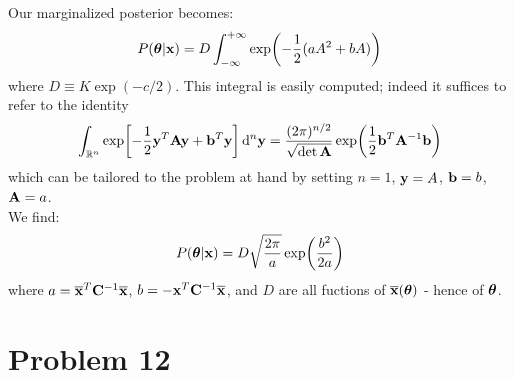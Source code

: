 \documentclass[a4paper]{article}
\newcommand{\R}{\mathbb{R}}
\newcommand{\mat}[1]{\vb{#1}}
\begin{document}
Our marginalized posterior becomes:
\begin{equation*}
    P(\vb*{\theta}|\vb{x}) = D \int_{-\infty}^{+\infty} \exp(-\frac{1}{2}(aA^2+bA))
\end{equation*}
where $D\equiv K \exp(-c/2)$. This integral is easily computed; indeed it suffices to refer to the identity
\begin{equation*}
    \int_{\R^n} \exp[-\frac{1}{2}\vb{y}^T\mat{A}\vb{y} +\vb{b}^T \vb{y}] \dd[n]{\vb{y}} = \frac{(2\pi)^{n/2}}{\sqrt{\det\mat{A}}}\exp(\frac{1}{2}\vb{b}^T \mat{A}^{-1}\vb{b})
\end{equation*}
which can be tailored to the problem at hand by setting $n=1$, $\vb{y} = A$, $\vb{b} = b$, $\mat{A} = a$.\\
We find:
\begin{equation*}
    P(\vb*{\theta}|\vb{x}) = D \sqrt{\frac{2\pi}{a}}\exp(\frac{b^2}{2a})
\end{equation*}
where $a = \overline{\vb{x}}^T \mat{C}^{-1} \overline{\vb{x}}$, $b = - \vb{x}^T\mat{C}^{-1}\overline{\vb{x}}$, and $D$ are all fuctions of $\overline{\vb{x}}(\vb*{\theta})$ - hence of $\vb*{\theta}$.

\section{Problem 12}
\end{document}
